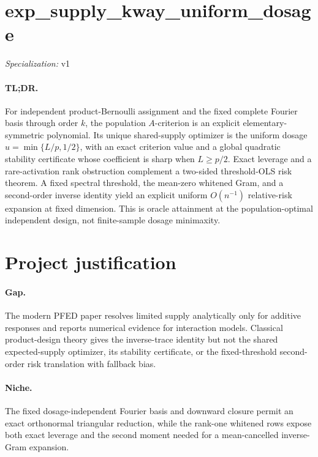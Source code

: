 \documentclass{article}
\begin{document}
\sloppy

\section*{exp\_\allowbreak{}supply\_\allowbreak{}kway\_\allowbreak{}uniform\_\allowbreak{}dosage}

\noindent\textit{Specialization:} v1\par

\paragraph{TL;DR.} For independent product-Bernoulli assignment and the fixed complete Fourier basis through order \(k\), the population \(A\)-criterion is an explicit elementary-symmetric polynomial. Its unique shared-supply optimizer is the uniform dosage \(u=\min\{L/p,1/2\}\), with an exact criterion value and a global quadratic stability certificate whose coefficient is sharp when \(L\ge p/2\). Exact leverage and a rare-activation rank obstruction complement a two-sided threshold-OLS risk theorem. A fixed spectral threshold, the mean-zero whitened Gram, and a second-order inverse identity yield an explicit uniform \(O(n^{-1})\) relative-risk expansion at fixed dimension. This is oracle attainment at the population-optimal independent design, not finite-sample dosage minimaxity.

\section{Project justification}

\paragraph{Gap.} The modern PFED paper resolves limited supply analytically only for additive responses and reports numerical evidence for interaction models. Classical product-design theory gives the inverse-trace identity but not the shared expected-supply optimizer, its stability certificate, or the fixed-threshold second-order risk translation with fallback bias.

\paragraph{Niche.} The fixed dosage-independent Fourier basis and downward closure permit an exact orthonormal triangular reduction, while the rank-one whitened rows expose both exact leverage and the second moment needed for a mean-cancelled inverse-Gram expansion.
\end{document}
